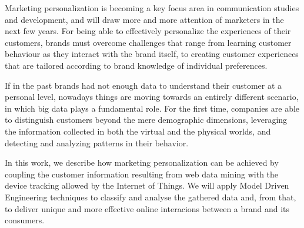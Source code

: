 \renewcommand{\sfdefault}{phv}
Marketing personalization is becoming a key focus area in communication studies and development, and will draw more and more attention of marketers in the next few years. For being able to effectively personalize the experiences of their customers, brands must overcome challenges that range from learning customer behaviour as they interact with the brand itself, to creating customer experiences that are tailored according to brand knowledge of individual preferences.

If in the past brands had not enough data to understand their customer at a personal level, nowadays things are moving towards an entirely different scenario, in which big data plays a fundamental role. For the first time, companies are able to distinguish customers beyond the mere demographic dimensions, leveraging the information collected in both the virtual and the physical worlds, and detecting  and analyzing patterns in their behavior.

In this work, we describe how marketing personalization can be achieved by coupling  the customer information resulting from web data mining with the device tracking allowed by the Internet of Things. We will apply Model Driven Engineering techniques to classify and analyse the gathered data and, from that, to deliver unique and more effective online interacions between a brand and its consumers.
